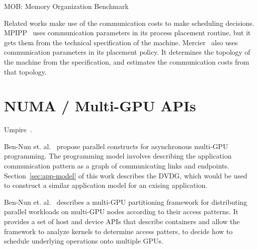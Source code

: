 MOB:
Memory Organization Benchmark

Related works make use of the communication costs to make scheduling decisions.
MPIPP~\cite{chen2006mpipp} uses communication parameters in its process placement routine, but it gets them from the technical specification of the machine.
Mercier~\cite{mercier2009towards} also uses communication parameters in its placement policy.
It determines the topology of the machine from the specification, and estimates the communication costs from that topology.


\section{NUMA / Multi-GPU APIs}

Umpire~\cite{beckingsale2018umpire}.

Ben-Nun et. al.~\cite{ben2017groute} propose parallel constructs for asynchronous multi-GPU programming.
The programming model involves describing the application communication pattern as a graph of communicating links and endpoints.
Section~\ref{sec:app-model} of this work describes the DVDG, which would be used to construct a similar application model for an exising application.

Ben-Nun et. al.~\cite{ben2015memory} describes a multi-GPU partitioning framework for distributing parallel workloads on multi-GPU nodes according to their access patterns.
It provides a set of host and device APIs that describe containers and allow the framework to analyze kernels to determine access patters, to decide how to schedule underlying operations onto multiple GPUs.

